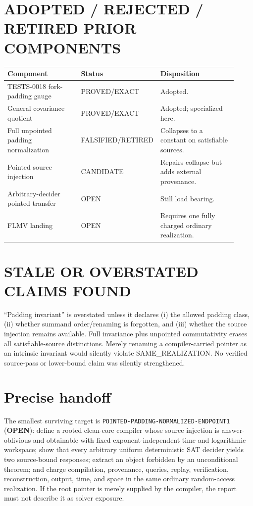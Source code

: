 \documentclass[11pt]{article}
\newcommand{\OPEN}{\textbf{OPEN}}
\begin{document}
\section{ADOPTED / REJECTED / RETIRED PRIOR COMPONENTS}

\begin{center}
\begin{tabular}{@{}p{0.35\linewidth}p{0.2\linewidth}p{0.37\linewidth}@{}}
\toprule
Component & Status & Disposition\\
\midrule
TESTS-0018 fork-padding gauge & PROVED/EXACT & Adopted.\\
General covariance quotient & PROVED/EXACT & Adopted; specialized here.\\
Full unpointed padding normalization & FALSIFIED/RETIRED & Collapses to a constant on satisfiable sources.\\
Pointed source injection & CANDIDATE & Repairs collapse but adds external provenance.\\
Arbitrary-decider pointed transfer & OPEN & Still load bearing.\\
FLMV landing & OPEN & Requires one fully charged ordinary realization.\\
\bottomrule
\end{tabular}
\end{center}

\section{STALE OR OVERSTATED CLAIMS FOUND}

``Padding invariant'' is overstated unless it declares (i) the allowed
padding class, (ii) whether summand order/renaming is forgotten, and (iii)
whether the source injection remains available.  Full invariance plus
unpointed commutativity erases all satisfiable-source distinctions.  Merely
renaming a compiler-carried pointer as an intrinsic invariant would silently
violate SAME\_REALIZATION.  No verified source-pass or lower-bound claim was
silently strengthened.

\section{Precise handoff}

The smallest surviving target is
\texttt{POINTED-PADDING-NORMALIZED-ENDPOINT1} (\OPEN): define a rooted
clean-core compiler whose source injection is answer-oblivious and obtainable
with fixed exponent-independent time and logarithmic workspace; show that
every arbitrary uniform deterministic SAT decider yields two source-bound
responses; extract an object forbidden by an unconditional theorem; and
charge compilation, provenance, queries, replay, verification,
reconstruction, output, time, and space in the same ordinary random-access
realization.  If the root pointer is merely supplied by the compiler, the
report must not describe it as solver exposure.
\end{document}
